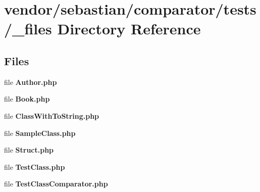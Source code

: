 \section{vendor/sebastian/comparator/tests/\+\_\+files Directory Reference}
\label{dir_b341001611a856a07704697e2bcdf7a4}
\subsection*{Files}
\begin{DoxyCompactItemize}
\item 
file {\bf Author.\+php}
\item 
file {\bf Book.\+php}
\item 
file {\bf Class\+With\+To\+String.\+php}
\item 
file {\bf Sample\+Class.\+php}
\item 
file {\bf Struct.\+php}
\item 
file {\bf Test\+Class.\+php}
\item 
file {\bf Test\+Class\+Comparator.\+php}
\end{DoxyCompactItemize}

